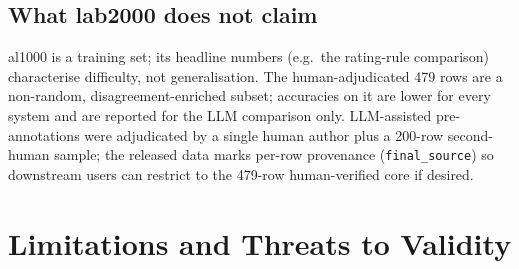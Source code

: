 \documentclass[11pt,a4paper]{article}
\newcommand{\code}[1]{\texttt{#1}}
\begin{document}
\subsection{What lab2000 does not claim}
\label{sec:lab2000-caveats}

al1000 is a training set; its headline numbers (e.g.\ the rating-rule
comparison) characterise difficulty, not generalisation. The
human-adjudicated 479 rows are a non-random, disagreement-enriched
subset; accuracies on it are lower for every system and are reported
for the LLM comparison only. LLM-assisted pre-annotations were
adjudicated by a single human author plus a 200-row second-human
sample; the released data marks per-row provenance
(\code{final\_source}) so downstream users can restrict to the
479-row human-verified core if desired.

\section{Limitations and Threats to Validity}
\label{sec:limits}
\end{document}

